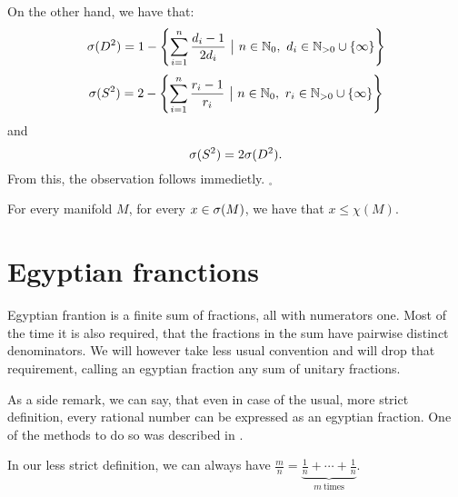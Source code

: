On the other hand, we have that:
\begin{equation}
\speD = 1-\left\{\sum\limits_{i=1}^n\frac{d_i-1}{2d_i}\ 
\big|\ n\in\mathbb{N}_0,\ d_i\in\mathbb{N}_{>0}\cup \{\infty\}\right\}
\end{equation}
\begin{equation}
\speS = 2 - \left\{\sum\limits_{i=1}^n \frac{r_i-1}{r_i}\ \big|\ n\in\mathbb{N}_0,\ 
r_i\in\mathbb{N}_{>0}\cup \{\infty\}\right\}
\end{equation}
and
\begin{equation}
{{\sigma}(S^2)} = 2{{\sigma}(D^2)}.
\end{equation}
From this, the observation follows immedietly. $_\square$

\begin{observation}\label{spectrum lesser than chi}
For every manifold $M$, for every $x \in {{\sigma}(M)}$, we have that $x \leq \chi(M)$.
\end{observation}


\section{Egyptian franctions}
Egyptian frantion is a finite sum of fractions, all with numerators one. 
Most of the time it is also required, that the fractions in the sum have pairwise distinct 
denominators. We will however take less usual convention and will drop that requirement, 
calling an egyptian fraction any sum of unitary fractions. 

As a side remark, we can say, that even in case of the usual, more strict definition, 
every rational number can be expressed as an egyptian fraction. One of the methods 
to do so was described in \cite{Engel1913}.

In our less strict definition, we can always have 
$\frac{m}{n} = \underbrace{\frac{1}{n}+\cdots+\frac{1}{n}}_{m\ \mathrm{times}}$.
